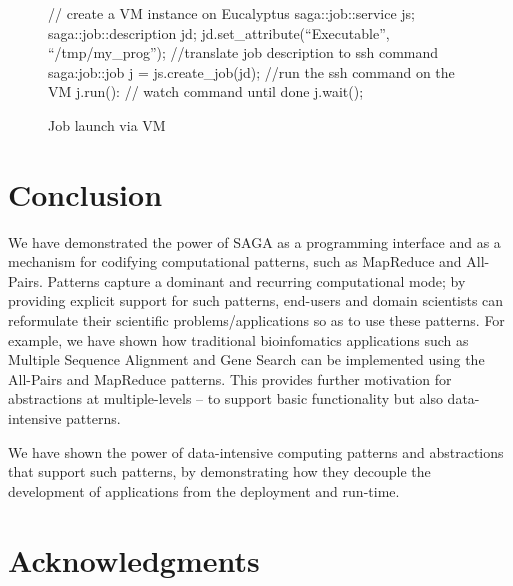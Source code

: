 \documentclass[conference,final]{IEEEtran}
\newcommand{\jhanote}[1]{ {\textcolor{red} { ***SJ: #1 }}}
\newcommand{\jhanote}[1]{}
\begin{document}
\begin{figure}[!ht]
 \begin{center}
  \begin{mycode}[label=SAGA create a VM instance on Eucalyptus]
   {// create a VM instance on Eucalyptus
    saga::job::service js;
    saga::job::description jd;
    jd.set_attribute(``Executable'', ``/tmp/my_prog'');
    //translate job description to ssh command
    saga:job::job j = js.create_job(jd);
    //run the ssh command on the VM
    j.run():
    // watch command until done
    j.wait();
   } 
  \end{mycode}
  \caption{\label{vmjob} Job launch via VM}
 \end{center}
\end{figure}


\section{Conclusion}
We have demonstrated the power of SAGA as a programming interface and
as a mechanism for codifying computational patterns, such as MapReduce
and All-Pairs.  Patterns capture a dominant and recurring
computational mode; by providing explicit support for such patterns,
end-users and domain scientists can reformulate their scientific
problems/applications so as to use these patterns. For example, we
have shown how traditional bioinfomatics applications such as Multiple
Sequence Alignment and Gene Search can be implemented using the
All-Pairs and MapReduce patterns. This provides further motivation for
abstractions at multiple-levels -- to support basic functionality but
also data-intensive patterns.

We have shown the power of data-intensive computing patterns and
abstractions that support such patterns, by demonstrating how they
decouple the development of applications from the deployment and
run-time.







\section{Acknowledgments}
\end{document}
